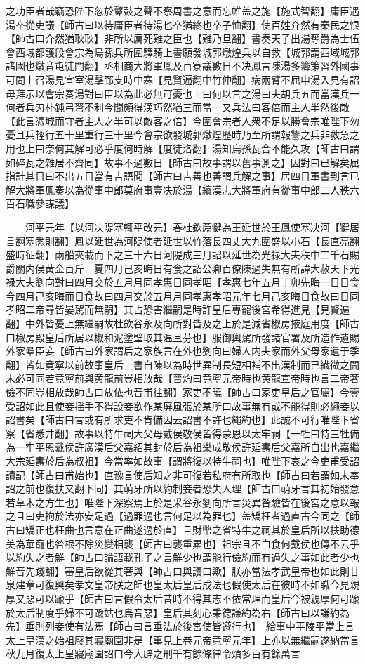 之功臣者哉竊恐陛下忽於鼙鼔之聲不察周書之意而忘帷盖之施【施式智翻】庸臣遇湯卒從吏議【師古曰以待庸臣者待湯也卒猶終也卒子恤翻】使百姓介然有秦民之恨【師古曰介然猶耿耿】非所以厲死難之臣也【難乃旦翻】書奏天子出湯奪爵為士伍會西域都護段會宗為烏孫兵所圍驛騎上書願發城郭燉煌兵以自救【城郭謂西域城郭諸國也燉音屯徒門翻】丞相商大將軍鳳及百寮議數日不决鳳言陳湯多籌策習外國事可問上召湯見宣室湯擊郅支時中寒【見賢遍翻中竹仲翻】病兩臂不屈申湯入見有詔毋拜示以會宗奏湯對曰臣以為此必無可憂也上曰何以言之湯曰夫胡兵五而當漢兵一何者兵刃朴鈍弓弩不利今聞頗得漢巧然猶三而當一又兵法曰客倍而主人半然後敵【此言憑城而守者主人之半可以敵客之倍】今圍會宗者人衆不足以勝會宗唯陛下勿憂且兵輕行五十里重行三十里今會宗欲發城郭燉煌歷時乃至所謂報讐之兵非救急之用也上曰奈何其解可必乎度何時解【度徒洛翻】湯知烏孫瓦合不能久攻【師古曰謂如碎瓦之雜居不齊同】故事不過數日【師古曰故事謂以舊事測之】因對曰已解矣屈指計其日曰不出五日當有吉語聞【師古曰吉善也善謂兵解之事】居四日軍書到言已解大將軍鳳奏以為從事中郎莫府事壹决於湯【續漢志大將軍府有從事中郎二人秩六百石職參謀議】

　　河平元年【以河决隄塞輒平改元】春杜欽薦犍為王延世於王鳳使塞决河【犍居言翻塞悉則翻】鳳以延世為河隄使者延世以竹落長四丈大九圍盛以小石【長直亮翻盛時征翻】兩船夾載而下之三十六日河隄成三月詔以延世為光禄大夫秩中二千石賜爵關内侯黄金百斤　夏四月己亥晦日有食之詔公卿百僚陳過失無有所諱大赦天下光禄大夫劉向對曰四月交於五月月同孝惠日同孝昭【孝惠七年五月丁卯先晦一日日食今四月己亥晦而日食故曰四月交於五月月同孝惠孝昭元年七月己亥晦日食故曰日同孝昭二帝尋皆晏駕而無嗣】其占恐害繼嗣是時許皇后專寵後宮希得進見【見賢遍翻】中外皆憂上無繼嗣故杜欽谷永及向所對皆及之上於是減省椒房掖庭用度【師古曰椒房殿皇后所居以椒和泥塗壁取其温且芬也】服御輿駕所發諸官署及所造作遺賜外家羣臣妾【師古曰外家謂后之家族言在外也劉向曰婦人内夫家而外父母家遺于季翻】皆如竟寧以前故事皇后上書自陳以為時世異制長短相補不出漢制而已纎微之間未必可同若竟寧前與黄龍前豈相放哉【晉灼曰竟寧元帝時也黄龍宣帝時也言二帝奢儉不同豈相放哉師古曰放依也音甫往翻】家吏不曉【師古曰家吏皇后之官屬】今壹受詔如此且使妾揺手不得設妾欲作某屏風張於某所曰故事無有或不能得則必繩妾以詔書矣【師古曰言或有所求吏不肯備因云詔書不許也繩約也】此誠不可行唯陛下省察【省悉井翻】故事以特牛祠大父母戴侯敬侯皆得蒙恩以太牢祠【一牲曰特三牲備為一牢平恩戴侯許廣漢后父嘉紹其封於后為祖樂成敬侯許延夀后父嘉所自出也嘉繼大宗延夀於后為叔祖】今當率如故事【謂將復以特牛祠也】唯陛下哀之今吏甫受詔讀記【師古曰甫始也】直豫言使后知之非可復若私府有所取也【師古曰若謂如未奉詔之前也復扶又翻下同】其萌牙所以約制妾者恐失人理【師古曰萌牙言其初始發意若草木之方生也】唯陛下深察焉上於是采谷永劉向所言災異咎驗皆在後宮之意以報之且曰吏拘於法亦安足過【過罪過也言何足以為罪也】盖矯枉者過直古今同之【師古曰矯正也枉曲也言意在正曲遂過於直】且財幣之省特牛之祠其於皇后所以扶助德美為華寵也咎根不除災變相襲【師古曰襲重累也】祖宗且不血食何戴侯也傳不云乎以約失之者鮮【師古曰論語載孔子之言鮮少也謂能行儉約而有過失之事如此者少也鮮音先踐翻】審皇后欲從其奢與【師古曰與讀曰歟】朕亦當法孝武皇帝也如此則甘泉建章可復興矣孝文皇帝朕之師也皇太后皇后成法也假使太后在彼時不如職今見親厚又惡可以踰乎【師古曰言假令太后昔時不得其志不依常理而皇后今被親厚何可踰於太后制度乎婦不可踰姑也烏音惡】皇后其刻心秉德謙約為右【師古曰以謙約為先】垂則列妾使有法焉【師古曰言垂法於後宮使皆遵行也】　給事中平陵平當上言太上皇漢之始祖廢其寢廟園非是【事見上卷元帝竟寧元年】上亦以無繼嗣遂納當言秋九月復太上皇寢廟園詔曰今大辟之刑千有餘條律令煩多百有餘萬言

